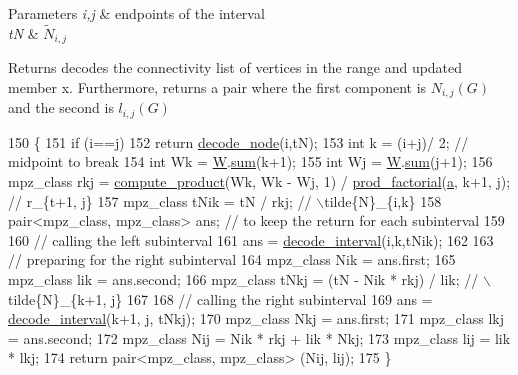 \begin{DoxyParams}{Parameters}
{\em i,j} & endpoints of the interval \\
\hline
{\em tN} & $\tilde{N}_{i,j}$ \\
\hline
\end{DoxyParams}
\begin{DoxyReturn}{Returns}
decodes the connectivity list of vertices in the range and updated member x. Furthermore, returns a pair where the first component is $N_{i,j}(G)$ and the second is $l_{i,j}(G)$ 
\end{DoxyReturn}

\begin{DoxyCode}
150 \{
151   \textcolor{keywordflow}{if} (i==j)
152     \textcolor{keywordflow}{return} \hyperlink{classb__graph__decoder_a3d6d38da4436a92ebd01693cd3eb7c16}{decode\_node}(i,tN);
153   \textcolor{keywordtype}{int} k = (i+j)/ 2; \textcolor{comment}{// midpoint to break}
154   \textcolor{keywordtype}{int} Wk = \hyperlink{classb__graph__decoder_a2c3f91db1f54ddfd411f74d18b01b606}{W}.\hyperlink{classreverse__fenwick__tree_a672731fd6395b4853430073a099a80e6}{sum}(k+1);
155   \textcolor{keywordtype}{int} Wj = \hyperlink{classb__graph__decoder_a2c3f91db1f54ddfd411f74d18b01b606}{W}.\hyperlink{classreverse__fenwick__tree_a672731fd6395b4853430073a099a80e6}{sum}(j+1);
156   mpz\_class rkj = \hyperlink{compression__helper_8cpp_ac683dff9ff89796df0ab62cd65c30990}{compute\_product}(Wk, Wk - Wj, 1) / 
      \hyperlink{compression__helper_8cpp_a86d8a20e022dc06b23df3b08ac10b7d1}{prod\_factorial}(\hyperlink{classb__graph__decoder_afcf783e4199fb8f9d6828db08bb12333}{a}, k+1, j); \textcolor{comment}{// r\_\{t+1, j\}}
157   mpz\_class tNik = tN / rkj; \textcolor{comment}{// \(\backslash\)tilde\{N\}\_\{i,k\}}
158   pair<mpz\_class, mpz\_class> ans; \textcolor{comment}{// to keep the return for each subinterval}
159 
160   \textcolor{comment}{// calling the left subinterval }
161   ans = \hyperlink{classb__graph__decoder_ae8b20698e015819cbdb8da7997888fd8}{decode\_interval}(i,k,tNik);
162 
163   \textcolor{comment}{// preparing for the right subinterval}
164   mpz\_class Nik = ans.first;
165   mpz\_class lik = ans.second;
166   mpz\_class tNkj = (tN - Nik * rkj) / lik; \textcolor{comment}{// \(\backslash\)tilde\{N\}\_\{k+1, j\}}
167 
168   \textcolor{comment}{// calling the right subinterval}
169   ans = \hyperlink{classb__graph__decoder_ae8b20698e015819cbdb8da7997888fd8}{decode\_interval}(k+1, j, tNkj);
170   mpz\_class Nkj = ans.first;
171   mpz\_class lkj = ans.second;
172   mpz\_class Nij = Nik * rkj + lik * Nkj;
173   mpz\_class lij = lik * lkj;
174   \textcolor{keywordflow}{return} pair<mpz\_class, mpz\_class> (Nij, lij);
175 \}
\end{DoxyCode}
\mbox{\label{classb__graph__decoder_a3d6d38da4436a92ebd01693cd3eb7c16}} 
